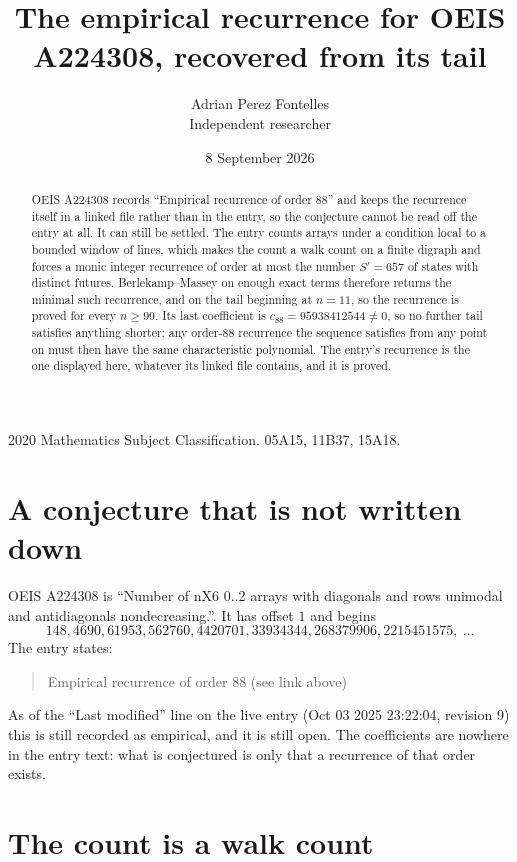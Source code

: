 \documentclass[11pt,a4paper]{article}
\title{The empirical recurrence for OEIS A224308, recovered from its tail}
\author{Adrian Perez Fontelles\\ \small Independent researcher}
\date{8 September 2026}
\theoremstyle{plain}
\theoremstyle{definition}
\begin{document}
\maketitle

\begin{abstract}
OEIS A224308 records ``Empirical recurrence of order $88$'' and keeps the recurrence itself in
a linked file rather than in the entry, so the conjecture cannot be read off the entry at all.
It can still be settled. The entry counts arrays under a condition local to a bounded window of
lines, which makes the count a walk count on a finite digraph and forces a monic integer
recurrence of order at most the number $S'=657$ of states with distinct futures. Berlekamp--Massey on
enough exact terms therefore returns the minimal such recurrence, and on the tail beginning at $n=11$, so the recurrence is proved for every $n\ge99$.
Its last coefficient is $c_{88}=95938412544\neq0$, so no further tail satisfies anything
shorter; any order-$88$ recurrence the sequence satisfies from any point on must then have
the same characteristic polynomial. The entry's recurrence is the one displayed here, whatever
its linked file contains, and it is proved.
\end{abstract}

\noindent\small 2020 Mathematics Subject Classification. 05A15, 11B37, 15A18.\normalsize

\section{A conjecture that is not written down}

OEIS A224308 is ``Number of nX6 0..2 arrays with diagonals and rows unimodal and antidiagonals nondecreasing.''. It has offset $1$ and begins
\[
148, 4690, 61953, 562760, 4420701, 33934344, 268379906, 2215451575,\ \dots
\]
The entry states:
\begin{quote}
Empirical recurrence of order 88 (see link above)
\end{quote}
As of the ``Last modified'' line on the live entry (Oct 03 2025 23:22:04, revision 9)
this is still recorded as empirical, and it is still open. The coefficients are nowhere in the
entry text: what is conjectured is only that a recurrence of that order exists.

\section{The count is a walk count}
\end{document}
